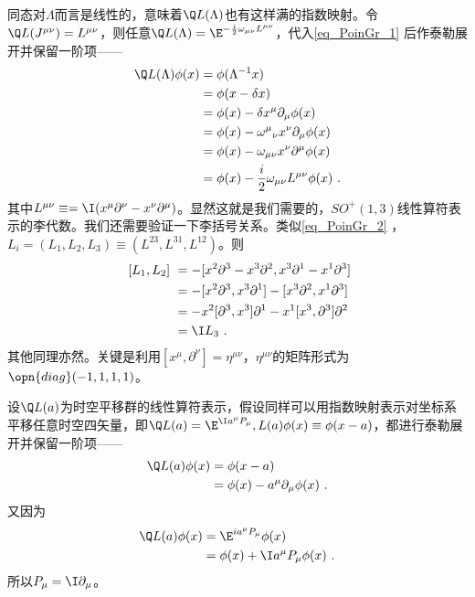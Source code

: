 同态对$\Lambda$而言是线性的，意味着$\Q L(\Lambda)$也有这样满的指数映射。令$\Q L(J^{\mu \nu})=L^{\mu \nu}$，则任意$\Q L(\Lambda)=\E^{-\frac{i}{2} \omega_{\mu \nu} L^{\mu \nu}}$，代入\autoref{eq_PoinGr_1} 后作泰勒展开并保留一阶项——
\begin{equation}
\begin{aligned}
\Q L(\Lambda)\phi(x)&=\phi(\Lambda^{-1}x)\\
&=\phi(x-\delta x)\\
&= \phi(x)-\delta x^{\mu} \partial_{\mu} \phi(x) \\
&= \phi(x)-\omega^{\mu}{ }_{\nu} x^{\nu} \partial_{\mu} \phi(x) \\
&=\phi(x)-\omega_{\mu \nu} x^{\nu} \partial^{\mu} \phi(x) \\
&= \phi(x)-\frac{i}{2} \omega_{\mu \nu} L^{\mu \nu} \phi(x)~.
\end{aligned}
\end{equation}
其中$L^{\mu\nu}\equiv=\I(x^{\mu}\partial^{\nu}-x^{\nu}\partial^{\mu})$。显然这就是我们需要的，$SO^+(1,3)$线性算符表示的李代数。我们还需要验证一下李括号关系。类似\autoref{eq_PoinGr_2}  ，$L_i=(L_1,L_2,L_3)\equiv(L^{23},L^{31},L^{12})$。则
\begin{equation}
\begin{aligned}
~[L_1,L_2]~&=-[x^{2}\partial^{3}-x^{3}\partial^{2},x^{3}\partial^{1}-x^{1}\partial^{3}]\\
&=-[x^2\partial^3,x^3\partial^1]-[x^3\partial^2,x^1\partial^3]\\
&=-x^2[\partial^3,x^3]\partial^1-x^1[x^3,\partial^3]\partial^2\\
&=\I L_3~.
\end{aligned}
\end{equation}
其他同理亦然。关键是利用$[x^{\mu},\partial^{\nu}]=\eta^{\mu\nu}$，$\eta^{\mu\nu}$的矩阵形式为$\opn{diag}(-1,1,1,1)$。

设$\Q L(a)$为时空平移群的线性算符表示，假设同样可以用指数映射表示对坐标系平移任意时空四矢量，即$\Q L(a)=\E^{\I a^{\mu}P_{\mu}},L(a)\phi(x)\equiv \phi(x-a)$，都进行泰勒展开并保留一阶项——
\begin{equation}\begin{aligned}
\Q L(a)\phi(x)& =\phi(x-a) \\
&=\phi(x)-a^{\mu}\partial_{\mu}\phi(x)~.
\end{aligned}\end{equation}
又因为
\begin{equation}
\begin{aligned}
\Q L(a)\phi(x)& = \E^{ia^{\mu}P_{\mu}}\phi(x) \\
&=\phi(x)+\I a^{\mu}P_{\mu}\phi(x)~.
\end{aligned}
\end{equation}
所以$P_{\mu}=\I\partial_{\mu}$。



